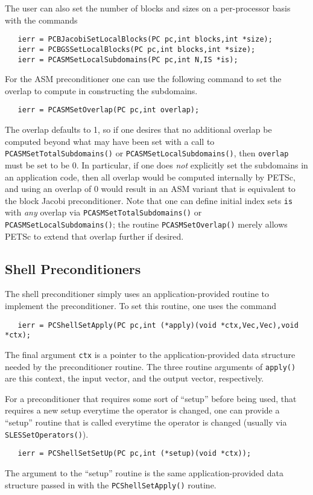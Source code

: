 The user can also set the number of blocks and sizes on a per-processor
basis with the commands
\begin{verbatim}
   ierr = PCBJacobiSetLocalBlocks(PC pc,int blocks,int *size);
   ierr = PCBGSSetLocalBlocks(PC pc,int blocks,int *size);
   ierr = PCASMSetLocalSubdomains(PC pc,int N,IS *is);
\end{verbatim}

For the ASM preconditioner one can use the following command to set
the overlap to compute in constructing the subdomains.
\begin{verbatim}
   ierr = PCASMSetOverlap(PC pc,int overlap);
\end{verbatim}
The overlap defaults to 1, so if one desires that no additional
overlap be computed beyond what may have been set with a call to {\tt
PCASMSetTotalSubdomains()} or {\tt PCASMSetLocalSubdomains()}, then
{\tt overlap} must be set to be 0.  In particular, if one does {\em
not} explicitly set the subdomains in an application code, then all
overlap would be computed internally by PETSc, and using an overlap of
0 would result in an ASM variant that is equivalent to the block
Jacobi preconditioner.  Note that one can define initial index sets
{\tt is} with {\em any} overlap via {\tt PCASMSetTotalSubdomains()} or
{\tt PCASMSetLocalSubdomains()}; the routine {\tt PCASMSetOverlap()}
merely allows PETSc to extend that overlap further if desired.

\subsection{Shell Preconditioners}

The shell preconditioner simply uses an application-provided routine to 
implement the preconditioner. To set this routine, one uses the 
command 
\begin{verbatim}
   ierr = PCShellSetApply(PC pc,int (*apply)(void *ctx,Vec,Vec),void *ctx);
\end{verbatim}
The final argument {\tt ctx} is a pointer to the application-provided 
data structure needed by the preconditioner routine.
The three routine arguments of {\tt apply()} are this context, the
input vector, and the output vector, respectively.

For a preconditioner that requires some sort of ``setup'' before being used,
that requires a new setup everytime the operator is changed, one can 
provide a ``setup'' routine that is called everytime the operator is 
changed (usually via {\tt SLESSetOperators()}).
\begin{verbatim}
   ierr = PCShellSetSetUp(PC pc,int (*setup)(void *ctx));
\end{verbatim}
The argument to the ``setup'' routine is the same application-provided 
data structure passed in with the {\tt PCShellSetApply()} routine.

